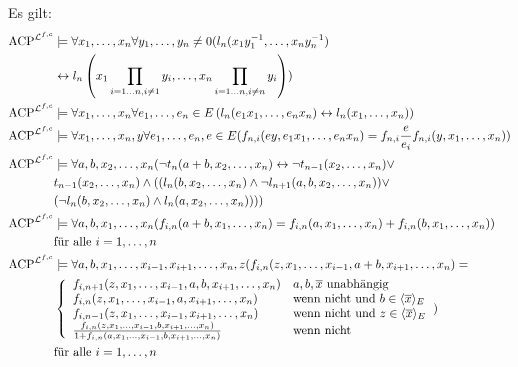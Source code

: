     \begin{lemma}\label{Eliminierungsregeln}
    	Es gilt:\\
    	\begin{align*}\operatorname{ACP}^{\lfc}&\models\forall x_1,\dots,x_n\forall y_1,\dots,y_n\neq0(l_n(x_1y_1^{-1},\dots,x_ny_n^{-1})\\&\leftrightarrow l_n\left(x_1\prod\limits_{i=1\dots n,i\neq 1}y_i,\dots,x_n\prod\limits_{i=1\dots n,i\neq n}y_i\right))\\
    	\operatorname{ACP}^{\lfc}&\models\forall x_1,\dots,x_n\forall e_1,\dots,e_n\in E\left(l_n(e_1x_1,\dots,e_nx_n)\leftrightarrow l_n(x_1,\dots,x_n)\right)\\
    	\operatorname{ACP}^{\lfc}&\models\forall x_1,\dots,x_n,y\forall e_1,\dots,e_n,e\in E(f_{n,i}(ey,e_1x_1,\dots,e_nx_n)=f_{n,i}\frac{e}{e_i}f_{n,i}(y,x_1,\dots,x_n))\\
    	\operatorname{ACP}^{\lfc}&\models\forall a,b,x_2,\dots,x_n(\neg t_n(a+b,x_2,\dots,x_n)\leftrightarrow\neg t_{n-1}(x_2,\dots,x_n)\lor\\
    	&t_{n-1}(x_2,\dots,x_n)\land((l_n(b,x_2,\dots,x_n)\land\neg l_{n+1}(a,b,x_2,\dots,x_n))\lor\\
    	&(\neg l_n(b,x_2,\dots,x_n)\land l_n(a,x_2,\dots,x_n))))\\
    	\operatorname{ACP}^{\lfc}&\models\forall a,b,x_1,\dots,x_n(f_{i,n}(a+b,x_1,\dots,x_n)=f_{i,n}(a,x_1,\dots,x_n)+f_{i,n}(b,x_1,\dots,x_n))\\
    	&\text{für alle }i=1,\dots,n\\
    	\operatorname{ACP}^{\lfc}&\models\forall a,b,x_1,\dots,x_{i-1},x_{i+1},\dots,x_n,z(f_{i,n}(z,x_1,\dots,x_{i-1},a+b,x_{i+1},\dots,x_n)=\\
    	&\left\{\begin{array}{ll}
    	f_{i,n+1}(z,x_1,\dots,x_{i-1},a,b,x_{i+1},\dots,x_n)& a,b,\overline{x}\text{ unabhängig}\\
    	f_{i,n}(z,x_1,\dots,x_{i-1},a,x_{i+1},\dots,x_n)&\text{wenn nicht und }b\in\langle\overline{x}\rangle_E\\
    	f_{i,n-1}(z,x_1,\dots,x_{i-1},x_{i+1},\dots,x_n)&\text{wenn nicht und }z\in\langle\overline{x}\rangle_E\\
    	\frac{f_{i,n}(z,x_1,\dots,x_{i-1},b,x_{i+1},\dots,x_n)}{1+f_{i,n}(a,x_1,\dots,x_{i-1},b,x_{i+1},\dots,x_n)}&\text{wenn nicht}
    	\end{array}\right.)\\
    	&\text{für alle }i=1,\dots,n\\

\end{align*}
\end{lemma}
